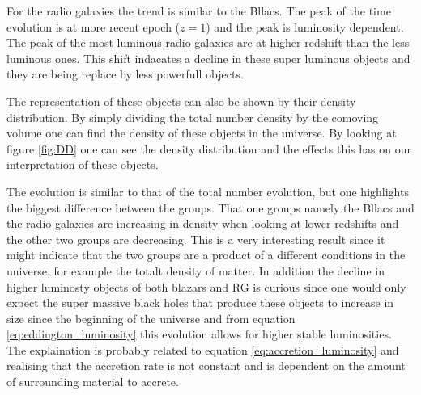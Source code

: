 \documentclass{article}
\begin{document}
For the radio galaxies the trend is similar to the Bllacs. The peak of the time evolution is at more recent epoch ($z=1$) and the peak is 
luminosity dependent. The peak of the most luminous radio galaxies are at higher redshift than the less luminous ones. This shift indacates a decline in these super luminous objects and they are being replace by less powerfull objects. 


The representation of these objects can also be shown by their density distribution. By simply dividing the total number density by the comoving volume one can
find the density of these objects in the universe. By looking at figure \ref{fig:DD} one can see the density distribution and the effects this has on our interpretation of these objects.

The evolution is similar to that of the total number evolution, but one highlights the biggest difference between the groups. That one groups namely the Bllacs and the radio galaxies
are increasing in density when looking at lower redshifts and the other two groups are decreasing. This is a very interesting result since it might indicate that the two groups are 
a product of a different conditions in the universe, for example the totalt density of matter. In addition the decline in higher luminosty objects of both blazars and RG is curious since one would only expect the 
super massive black holes that produce these objects to increase in size since the beginning of the universe and from equation \ref{eq:eddington_luminosity} this evolution allows for higher stable luminosities. The explaination is probably related to equation \ref{eq:accretion_luminosity} 
and realising that the accretion rate is not constant and is dependent on the amount of surrounding material to accrete.  
\end{document}
